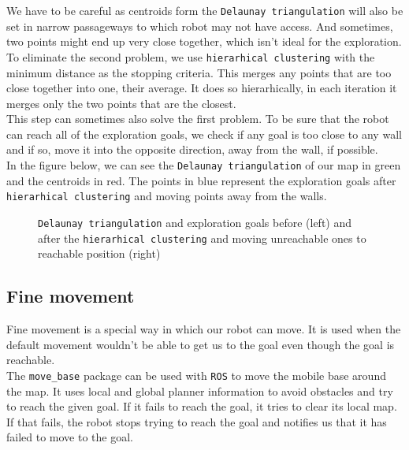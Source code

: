 \documentclass[12pt,a4paper]{article}
\begin{document}
	We have to be careful as centroids form the \texttt{Delaunay triangulation} will also be set in narrow passageways to which robot may not have access. And sometimes, two points might end up very close together, which isn't ideal for the exploration. \\
	
	To eliminate the second problem, we use \texttt{hierarhical clustering} with the minimum distance as the stopping criteria. This merges any points that are too close together into one, their average. It does so hierarhically, in each iteration it merges only the two points that are the closest. \\
	
	This step can sometimes also solve the first problem. To be sure that the robot can reach all of the exploration goals, we check if any goal is too close to any wall and if so, move it into the opposite direction, away from the wall, if possible. \\

	In the figure below, we can see the \texttt{Delaunay triangulation} of our map in green and the centroids in red. The points in blue represent the exploration goals after \texttt{hierarhical clustering} and moving points away from the walls.

	\begin{figure}[h]
		\centering
		\caption{\texttt{Delaunay triangulation} and exploration goals before (left) and after the \texttt{hierarhical clustering} and moving unreachable ones to reachable position (right)}
		\label{fig:exploration_goals}
	\end{figure}
	
	\subsection{Fine movement} \label{fine_movement}
	Fine movement is a special way in which our robot can move. It is used when the default movement wouldn't be able to get us to the goal even though the goal is reachable.  \\

	The \texttt{move\_base} package can be used with \texttt{ROS} to move the mobile base around the map. It uses local and global planner information to avoid obstacles and try to reach the given goal. If it fails to reach the goal, it tries to clear its local map. If that fails, the robot stops trying to reach the goal and notifies us that it has failed to move to the goal. \\
	
\end{document}
